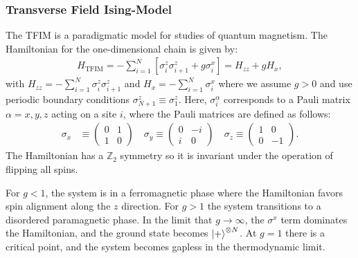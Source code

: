 \documentclass[
 aps,
 pra,
 showpacs,
 showkeys,
 superscriptaddress,
 reprint,%
twocolumn,
]{revtex4-1}
\begin{document}
        \subsubsection{Transverse Field Ising-Model}
        The TFIM is a paradigmatic model for studies of quantum magnetism. The Hamiltonian for the one-dimensional chain is given by:
        \begin{align}
            H_{\text{TFIM}} = -\sum_{i=1}^N\left[ \sigma_i^z \sigma_{i+1}^z + g \sigma_i^x \right]= H_{zz} + g H_x \label{eq:hamiltonian_TFIM},
        \end{align}
        with 
        $H_{zz} = -\sum_{i=1}^N \sigma_i^z \sigma_{i+1}^z$ and $H_x= - \sum_{i=1}^N \sigma_i^x$
        where we assume $g>0$ and use periodic boundary conditions $\sigma_{N+1}^{z}\equiv \sigma_1^{z}$. Here, $\sigma_{i}^\alpha$ corresponds to a Pauli matrix $\alpha=x,y,z$ acting on a site $i$, where the Pauli matrices are defined as follows:
    \begin{align*}
        \sigma_x &\equiv \begin{pmatrix}
                        0 & 1\\
                        1 & 0  
                \end{pmatrix} \quad
        \sigma_y \equiv \begin{pmatrix}
                        0 & -i\\
                        i & 0  
                \end{pmatrix} \quad
        \sigma_z \equiv \begin{pmatrix}
                        1 & 0\\
                        0 & -1  
                \end{pmatrix}.
    \end{align*} 
         The Hamiltonian has a $\mathbb{Z}_2$ symmetry so it is invariant under the operation of flipping all spins.
        
        For $g<1$, the system is in a ferromagnetic phase where the Hamiltonian favors spin alignment along the $z$ direction. For $g>1$ the system transitions to a disordered paramagnetic phase. In the limit that $g\to \infty$, the $\sigma^x$ term dominates the Hamiltonian, and the ground state becomes $\ket{+}^{\otimes N}$. At $g=1$ there is a critical point, and the system becomes gapless in the thermodynamic limit.
        
\end{document}
